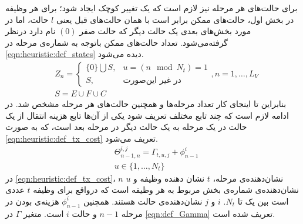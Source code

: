 	برای حالت‌های هر مرحله نیز لازم است که یک تغییر کوچک ایجاد شود؛ برای هر وظیفه در بخش اول، حالت‌های ممکن برابر است با همان حالت‌های قبل یعنی $l$ حالت، اما در مورد بخش‌های بعدی یک حالت دیگر که حالت صفر $(0)$ نام دارد درنظر گرفته‌می‌شود. تعداد حالت‌های ممکن باتوجه به شماره‌ی مرحله در \cref{eqn:heuristic:def_states} دیده می‌شود. 
	\begin{subequations}\label{eqn:heuristic:def_states}
		\begin{align}
			&Z_n =
			\begin{cases}
			\{0\} \bigcup S, & \text{$u = (n \mod N_t) = 1$} \\
			S,               & \text{در غیر این‌صورت}
			\end{cases}
			,n = 1, \dots, L_V \\
			&S = E \cup F \cup C
		\end{align}
	\end{subequations}
	بنابراین تا اینجای کار تعداد مرحله‌ها و همچنین حالت‌های هر مرحله مشخص شد. در ادامه لازم است که چند تابع مختلف تعریف شود یکی از آن‌ها تابع هزینه انتقال از یک حالت در یک مرحله به یک حالت دیگر در مرحله بعد است، که به صورت \cref{eqn:heuristic:def_tx_cost} تعریف می‌شود. 
\begin{subequations}
	\begin{align}\label{eqn:heuristic:def_tx_cost}
		&\Theta_{n-1,n}^{i,j} = \Gamma_{t,u,j} + \phi_{n-1}^i \\
		&u \in \{1, \dots, N_t\}
	\end{align}
\end{subequations}
در \cref{eqn:heuristic:def_tx_cost}، $n$ نشان‌دهنده‌ی مرحله، $t$ نشان دهنده وظیفه و $u$ نشان‌دهنده‌ی شماره‌ی بخش مربوط به هر وظیفه است که درواقع برای وظیفه $t$ عددی است بین یک تا $N_t$. $i$ و $j$ نشان‌دهنده‌ی حالت هستند. همچنین $\phi_{n-1}^i$ هزینه‌ی بودن در مرحله $n-1$ و حالت $i$ است. متغیر $\Gamma$ در \cref{eqn:def_Gamma} تعریف شده است. 
	
